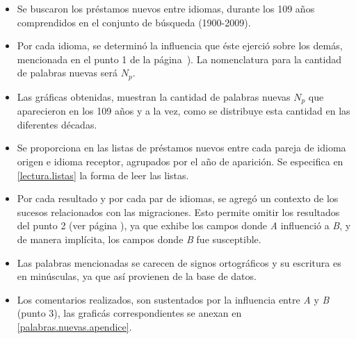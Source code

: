 \begin{itemize}

\item Se buscaron los préstamos nuevos entre idiomas,  durante los 109 años comprendidos en el conjunto de búsqueda (1900-2009).
	
\item Por cada idioma, se determinó la influencia que éste ejerció sobre los
demás, mencionada en el punto 1 de la página~\pageref{proceso.nuevos}). La
nomenclatura para la cantidad de palabras nuevas será $N_{p}$.

\item Las gráficas obtenidas, muestran la cantidad de palabras nuevas $N_{p}$
que aparecieron en los 109 años y a la vez, como se distribuye esta cantidad en
las diferentes décadas. 

\item Se proporciona en \cite{prestamos_nuevos} las listas  de préstamos nuevos entre cada pareja de idioma origen e idioma receptor, agrupados por el año de aparición.  Se especifica en \ref{lectura.listas}  la forma de leer las listas.

\item Por cada resultado y por cada par de idiomas, se agregó un contexto de los sucesos relacionados con las migraciones. Esto permite omitir los resultados del punto 2 (ver  página \pageref{proceso.nuevos}), ya que exhibe los campos donde \textit{A} influenció a  \textit{B}, y de manera implícita, los campos donde \textit{B} fue susceptible.

\item Las palabras mencionadas se carecen de signos ortográficos y su escritura es en minúsculas, ya que así provienen de la base de datos. 

\item Los comentarios realizados, son sustentados por la influencia entre \textit{A} y \textit{B} (punto 3), las graficás correspondientes se anexan en \ref{palabras.nuevas.apendice}. 

\end{itemize}




